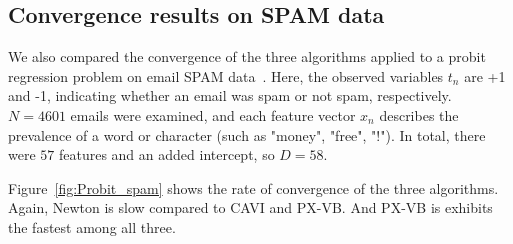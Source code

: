 \documentclass{article}
\begin{document}
\subsection{Convergence results on SPAM data}
We also compared the convergence of the three algorithms applied to a probit regression problem on email SPAM data~\cite{Efron}. Here, the observed variables $t_n$ are +1 and -1, indicating whether an email was spam or not spam, respectively. $N=4601$ emails were examined, and each feature vector $x_n$ describes the prevalence of a word or character (such as "money", "free", "!"). In total, there were $57$ features and an added intercept, so $D = 58$. 

Figure~\ref{fig:Probit_spam} shows the rate of convergence of the three algorithms.  Again, Newton is slow compared to CAVI and PX-VB. And PX-VB is exhibits the fastest among all three. 
\end{document}
